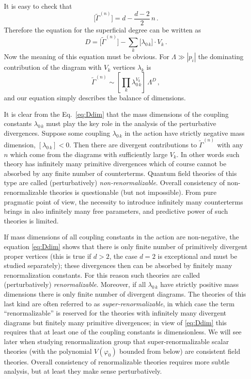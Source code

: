It is easy to check that
\[
\bigl[\tilde\Gamma^{(n)}\bigr]=d-\frac{d-2}2\,n\,.
\]
Therefore the equation for the superficial degree can be written as
\begin{equation}\label{eq:Ddim}
D=\bigl[\tilde\Gamma^{(n)}\bigr]-\sum_k\bigl[\lambda_{0\,k}\bigr]\cdot V_k\,.
\end{equation}
Now the meaning of this equation must be obvious. For $\Lambda\gg|p_i|$ the
dominating contribution of the diagram with $V_k$ vertices $\lambda_k$ is
\begin{equation}\label{eq:GammaLambda}
\tilde\Gamma^{(n)}\sim\left[\prod_k\lambda_{0\,k}^{V_k}\right]\,\Lambda^D\,,
\end{equation}
and our equation simply describes the balance of dimensions.

It is clear from the Eq.~\eqref{eq:Ddim} that the mass dimensions of the
coupling constants $\lambda_{0\,k}$ must play the key role in the analysis of
the perturbative divergences. Suppose some coupling $\lambda_{0\,k}$ in the
action have strictly negative mass dimension, $[\lambda_{0\,k}]<0$. Then there
are divergent contributions to $\tilde\Gamma^{(n)}$ with any $n$ which come
from the diagrams with sufficiently large $V_k$. In other words such theory has
infinitely many primitive divergences which of course cannot be absorbed by any
finite number of counterterms. Quantum field theories of this type are called
(perturbatively) \emph{non-renormalizable}. Overall consistency of
non-renormalizable theories is questionable (but not impossible). From pure
pragmatic point of view, the necessity to introduce infinitely many
counterterms brings in also infinitely many free parameters, and predictive
power of such theories is limited.

If mass dimensions of all coupling constants in the action are non-negative,
the equation \eqref{eq:Ddim} shows that there is only finite number of
primitively divergent proper vertices (this is true if $d>2$, the case $d=2$ is
exceptional and must be studied separately); these divergences then can be
absorbed by finitely many renormalization constants. For this reason such
theories are called (perturbatively) \emph{renormalizable}. Moreover, if all
$\lambda_{0\,k}$ have strictly positive mass dimensions there is only finite
number of divergent diagrams. The theories of this last kind are often referred
to as \emph{super-renormalizable}, in which case the term ``renormalizable'' is
reserved for the theories with infinitely many divergent diagrams but finitely
many primitive divergences; in view of \eqref{eq:Ddim} this requires that at
least one of the coupling constants is dimensionless. We will see later when
studying renormalization group that super-renormalizable scalar theories (with
the polynomial $V(\varphi_0)$ bounded from below) are consistent field
theories. Overall consistency of renormalizable theories requires more subtle
analysis, but at least they make sense perturbatively.

